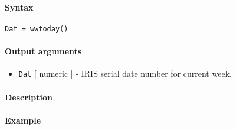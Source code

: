 


	\paragraph{Syntax}\label{syntax}

\begin{verbatim}
Dat = wwtoday()
\end{verbatim}

\paragraph{Output arguments}\label{output-arguments}

\begin{itemize}
\itemsep1pt\parskip0pt
\item
  \texttt{Dat} {[} numeric {]} - IRIS serial date number for current
  week.
\end{itemize}

\paragraph{Description}\label{description}

\paragraph{Example}\label{example}


